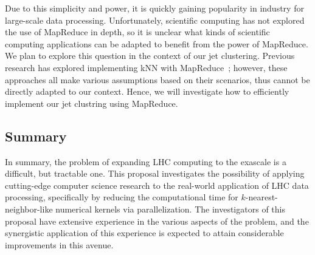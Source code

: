 \documentclass[12pt]{article}
\begin{document}
Due to this simplicity and power, it is quickly gaining popularity in industry
for large-scale data processing. Unfortunately, scientific computing has not
explored the use of MapReduce in depth, so it is unclear what kinds of
scientific computing applications can be adapted to benefit from the power of
MapReduce. We plan to explore this question in the context of our jet
clustering. Previous research has explored implementing kNN with
MapReduce~\cite{knn-mapreduce-0, knn-mapreduce-1}; however, these approaches all
make various assumptions based on their scenarios, thus cannot be directly
adapted to our context. Hence, we will investigate how to efficiently implement
our jet clustring using MapReduce.

\subsection{Summary}

In summary, the problem of expanding LHC computing to the exascale is
a difficult, but tractable one. This proposal investigates the
possibility of applying cutting-edge computer science research to the
real-world application of LHC data processing, specifically by
reducing the computational time for $k$-nearest-neighbor-like
numerical kernels via parallelization. The investigators of this
proposal have extensive experience in the various aspects of the
problem, and the synergistic application of this experience is
expected to attain considerable improvements in this avenue. 


{}
%
\end{document}

